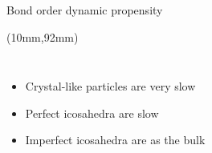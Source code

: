 \begin{frame}{Bond order dynamic propensity}
	\begin{textblock*}{0.6\textwidth}(10mm,92mm)
		\simplephasediagram{}
	\end{textblock*}
	\begin{columns}
	\resizebox{1.1\columnwidth}{!}{}
	\begin{itemize}
		\item Crystal-like particles are \alert{very slow}
		\item Perfect icosahedra are slow
		\item Imperfect icosahedra are as the bulk
	\end{itemize}
	\end{columns}
\end{frame}

